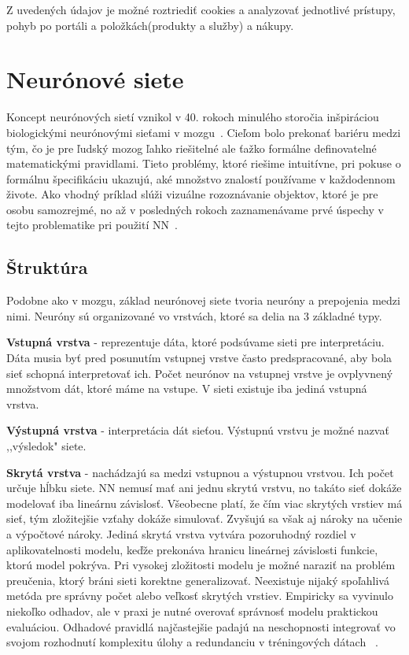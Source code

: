 Z uvedených údajov je možné roztriediť cookies a analyzovať jednotlivé prístupy, pohyb po portáli a položkách(produkty a služby) a nákupy.

\chapter{Neurónové siete}
\label{analyza_neuronove_siete}

Koncept neurónových sietí vznikol v 40. rokoch minulého storočia inšpiráciou biologickými neurónovými sieťami v mozgu~\cite{mcculloch1943logical}.
Cieľom bolo prekonať bariéru medzi tým, čo je pre ľudský mozog ľahko riešitelné ale ťažko formálne definovatelné matematickými pravidlami. Tieto problémy, ktoré riešime intuitívne, pri pokuse o formálnu špecifikáciu ukazujú, aké množstvo znalostí používame v každodennom živote. Ako vhodný príklad slúži vizuálne rozoznávanie objektov, ktoré je pre osobu samozrejmé, no až v posledných rokoch zaznamenávame prvé úspechy v tejto problematike pri použití NN~\cite{Goodfellow-et-al-2016-Book}.

\section{Štruktúra}
\label{analyza_struktura_nn}

Podobne ako v mozgu, základ neurónovej siete tvoria neuróny a prepojenia medzi nimi. Neuróny sú organizované vo vrstvách, ktoré sa delia na 3 základné typy. 
\noindent

\textbf{Vstupná vrstva} - reprezentuje dáta, ktoré podsúvame sieti pre interpretáciu. Dáta musia byť pred posunutím vstupnej vrstve často predspracované, aby bola sieť schopná interpretovať ich. Počet neurónov na vstupnej vrstve je ovplyvnený množstvom dát, ktoré máme na vstupe. V sieti existuje iba jediná vstupná vrstva.
\noindent

\textbf{Výstupná vrstva} - interpretácia dát sieťou. Výstupnú vrstvu je možné nazvať ,,výsledok"  siete.
\noindent

\textbf{Skrytá vrstva} - nachádzajú sa medzi vstupnou a výstupnou vrstvou. Ich počet určuje hĺbku siete. NN nemusí mať ani jednu skrytú vrstvu, no takáto sieť dokáže modelovať iba lineárnu závislosť. Všeobecne platí, že čím viac skrytých vrstiev má sieť, tým zložitejšie vzťahy dokáže simulovať. Zvyšujú sa však aj nároky na učenie a výpočtové nároky. Jediná skrytá vrstva vytvára pozoruhodný rozdiel v aplikovatelnosti modelu, keďže prekonáva hranicu lineárnej závislosti funkcie, ktorú model pokrýva. Pri vysokej zložitosti modelu je možné naraziť na problém preučenia, ktorý bráni sieti korektne generalizovať. Neexistuje nijaký spoľahlivá metóda pre správny počet alebo veľkosť skrytých vrstiev. Empiricky sa vyvinulo niekoľko odhadov, ale v praxi je nutné overovať správnosť modelu praktickou evaluáciou. Odhadové pravidlá najčastejšie padajú na neschopnosti integrovať vo svojom rozhodnutí komplexitu úlohy a redundanciu v tréningových dátach ~\cite{Goodfellow-et-al-2016-Book}.
\noindent

